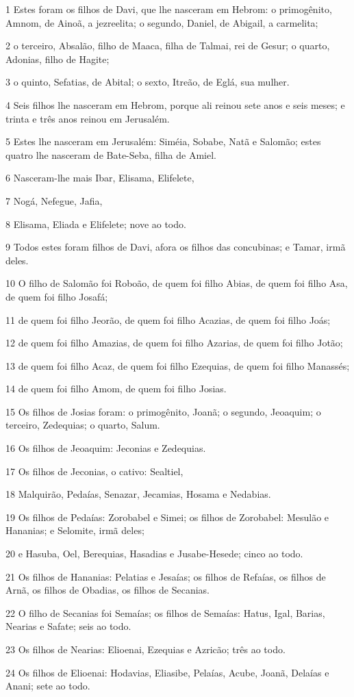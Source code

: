 \par 1 Estes foram os filhos de Davi, que lhe nasceram em Hebrom: o primogênito, Amnom, de Ainoã, a jezreelita; o segundo, Daniel, de Abigail, a carmelita;
\par 2 o terceiro, Absalão, filho de Maaca, filha de Talmai, rei de Gesur; o quarto, Adonias, filho de Hagite;
\par 3 o quinto, Sefatias, de Abital; o sexto, Itreão, de Eglá, sua mulher.
\par 4 Seis filhos lhe nasceram em Hebrom, porque ali reinou sete anos e seis meses; e trinta e três anos reinou em Jerusalém.
\par 5 Estes lhe nasceram em Jerusalém: Siméia, Sobabe, Natã e Salomão; estes quatro lhe nasceram de Bate-Seba, filha de Amiel.
\par 6 Nasceram-lhe mais Ibar, Elisama, Elifelete,
\par 7 Nogá, Nefegue, Jafia,
\par 8 Elisama, Eliada e Elifelete; nove ao todo.
\par 9 Todos estes foram filhos de Davi, afora os filhos das concubinas; e Tamar, irmã deles.
\par 10 O filho de Salomão foi Roboão, de quem foi filho Abias, de quem foi filho Asa, de quem foi filho Josafá;
\par 11 de quem foi filho Jeorão, de quem foi filho Acazias, de quem foi filho Joás;
\par 12 de quem foi filho Amazias, de quem foi filho Azarias, de quem foi filho Jotão;
\par 13 de quem foi filho Acaz, de quem foi filho Ezequias, de quem foi filho Manassés;
\par 14 de quem foi filho Amom, de quem foi filho Josias.
\par 15 Os filhos de Josias foram: o primogênito, Joanã; o segundo, Jeoaquim; o terceiro, Zedequias; o quarto, Salum.
\par 16 Os filhos de Jeoaquim: Jeconias e Zedequias.
\par 17 Os filhos de Jeconias, o cativo: Sealtiel,
\par 18 Malquirão, Pedaías, Senazar, Jecamias, Hosama e Nedabias.
\par 19 Os filhos de Pedaías: Zorobabel e Simei; os filhos de Zorobabel: Mesulão e Hananias; e Selomite, irmã deles;
\par 20 e Hasuba, Oel, Berequias, Hasadias e Jusabe-Hesede; cinco ao todo.
\par 21 Os filhos de Hananias: Pelatias e Jesaías; os filhos de Refaías, os filhos de Arnã, os filhos de Obadias, os filhos de Secanias.
\par 22 O filho de Secanias foi Semaías; os filhos de Semaías: Hatus, Igal, Barias, Nearias e Safate; seis ao todo.
\par 23 Os filhos de Nearias: Elioenai, Ezequias e Azricão; três ao todo.
\par 24 Os filhos de Elioenai: Hodavias, Eliasibe, Pelaías, Acube, Joanã, Delaías e Anani; sete ao todo.

